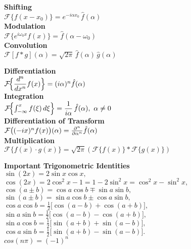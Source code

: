 \documentclass[8pt]{article}
\begin{document}
\begin{multicols}{2}
\begin{minipage}[htp]{0.55\textwidth}
\begin{multicols}{2}
    \textbf{Shifting} \\
    $\mathcal{F}\{f(x - x_0)\} = e^{-i\alpha x_0}\,\hat{f}(\alpha)$ \\[4pt]

    \textbf{Modulation} \\
    $\mathcal{F}\{e^{i\omega_0 x} f(x)\} = \hat{f}(\alpha - \omega_0)$ \\[4pt]

    \textbf{Convolution} \\
    $\mathcal{F}[f * g](\alpha)
    = \sqrt{2\pi} \,\hat{f}(\alpha)\,\hat{g}(\alpha)$ \\[4pt]
    \columnbreak

    \textbf{Differentiation} \\[2pt]
    $\mathcal{F}\!\Bigl\{\dfrac{d^n}{dx^n}f(x)\Bigr\} = (i\alpha)^n \hat{f}(\alpha)$ \\[4pt]

    \textbf{Integration} \\
    $\mathcal{F}\!\Bigl\{\int_{-\infty}^x f(\xi)\,d\xi\Bigr\}
        = \dfrac{1}{i\alpha}\,\hat{f}(\alpha), \ \alpha \neq 0$ \\[4pt]

    \textbf{Differentiation of Transform} \\[2pt]
    $
    \mathcal{F}\big((-ix)^n f(x)\big)(\alpha) = \frac{\partial^n}{\partial \alpha^n} \hat{f}(\alpha) \\[4pt]
    $\\
    \textbf{Multiplication} \\
    $
\mathcal{F}\{f(x) \cdot g(x)\} = \sqrt{2\pi}\left( \mathcal{F}\{f(x)\} * \mathcal{F}\{g(x)\} \right)
$ \\[4pt]
  \end{multicols}
\end{minipage}
\normalsize
\noindent \textbf{Important Trigonometric Identities} \\[2pt]
$\sin(2x) = 2\sin x\cos x,$ \\[3pt]
$\cos(2x) = 2\cos^2 x - 1 = 1 - 2\sin^2 x = \cos^2 x - \sin^2 x,$ \\[3pt]
$\cos(a \pm b) = \cos a\cos b \mp \sin a\sin b,$ \\[3pt]
$\sin(a \pm b) = \sin a\cos b \pm \cos a\sin b,$ \\[3pt]
$\cos a\cos b = \tfrac{1}{2}\bigl[\cos(a - b) + \cos(a + b)\bigr],$ \\[3pt]
$\sin a\sin b = \tfrac{1}{2}\bigl[\cos(a - b) - \cos(a + b)\bigr],$ \\[3pt]
$\sin a\cos b = \tfrac{1}{2}\bigl[\sin(a + b) + \sin(a - b)\bigr],$ \\[3pt]
$\cos a\sin b = \tfrac{1}{2}\bigl[\sin(a + b) - \sin(a - b)\bigr].$\\[3pt]
$cos(n \pi) = (-1)^n$
\normalsize
\end{multicols}
\endgroup
\end{document}
